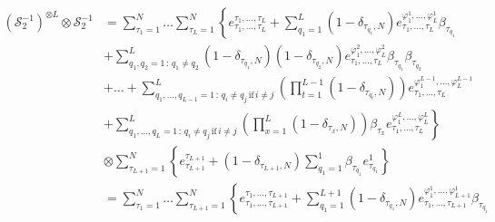 \documentclass[10pt]{article}
\numberwithin{equation}{section}
\numberwithin{equation}{subsection}
\begin{document}
\begin{align*}
    	\left(\mathcal{S}_{2}^{-1}\right)^{\otimes L}\otimes \mathcal{S}_{2}^{-1}&=%
    	\sum_{\tau_{1}=1}^{N}\ldots\sum_{\tau_{L}=1}^{N}\left\{e_{\tau_{1},\ldots,\tau_{L}}^{\tau_{1},\ldots,\tau_{L}}+\sum_{q_{1}=1}^{L}(1-\delta_{\tau_{q_{1}},N})e_{\tau_{1},\ldots,\tau_{L}}^{\varphi_{1}^{1},\ldots,\varphi_{L}^{1}}\beta_{\tau_{q_{1}}}\right. 
    	\\&+\left. \sum_{q_{1},q_{2}=1\,:\,q_{1}\neq q_{2}}^{L}(1-\delta_{\tau_{q_{1}},N})(1-\delta_{\tau_{q_{2}},N})e^{\varphi_{1}^{2},\ldots,\varphi_{L}^{2}}_{\tau_{1},\ldots,\tau_{L}}\beta_{\tau_{q_{1}}}\beta_{\tau_{q_{2}}}\right.
    	\\&+\left.
    	\ldots+	\sum_{q_{1},\ldots,q_{L-1}=1\,:\,q_{i}\neq q_{j}\,\text{if}\,i\neq j}^{L}\left(\prod_{t=1}^{L-1}(1-\delta_{\tau_{q_{t}},N})\right)e_{\tau_{1},\ldots,\tau_{L}}^{\varphi_{1}^{L-1},\ldots,\varphi_{L}^{L-1}}
    	\right. \\&+ \left. 
    	\sum_{q_{1},\ldots,q_{L}=1\,:\,q_{i}\neq q_{j}\,\text{if}\,i\neq j}^{L}\left(\prod_{x=1}^{L}(1-\delta_{\tau_{x},N})\right)\beta_{\tau_{x}}e_{\tau_{1},\ldots,\tau_{L}}^{\varphi_{1}^{L},\ldots,\varphi_{L}^{L}} \right\}
    	\\&
    	\otimes \sum_{\tau_{L+1}=1}^{N}\left\{e_{\tau_{L+1}}^{\tau_{L+1}}+(1-\delta_{\tau_{L+1},N})\sum_{q_{1}=1}^{1}\beta_{\tau_{q_{1}}}e_{\tau_{q_{1}}}^{1}\right\}
    	\\&=
    	\sum_{\tau_{1}=1}^{N}\ldots\sum_{\tau_{L+1}=1}^{N}\left\{e_{\tau_{1},\ldots,\tau_{L+1}}^{\tau_{1},\ldots,\tau_{L+1}}+\sum_{q_{1}=1}^{L+1}(1-\delta_{\tau_{q_{1}},N})e_{\tau_{1},\ldots,\tau_{L+1}}^{\varphi_{1}^{1},\ldots,\varphi_{L+1}^{1}}\beta_{\tau_{q_{1}}}\right. 

\end{align*}
\end{document}
